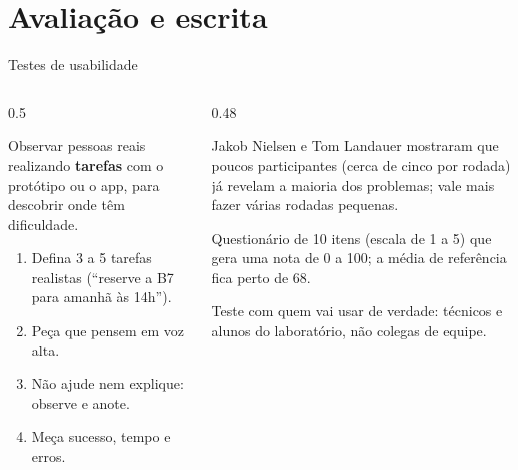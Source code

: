 \documentclass[aspectratio=169,10pt]{beamer}
\begin{document}
\section{Avaliação e escrita}

\begin{frame}{Testes de usabilidade}
  \begin{columns}[T]
    \begin{column}{0.5\textwidth}
      \begin{definicao}
        Observar pessoas reais realizando \textbf{tarefas} com o protótipo ou o app, para descobrir onde têm dificuldade.
      \end{definicao}
      \begin{conceito}
        \begin{enumerate}
          \item Defina 3 a 5 tarefas realistas (``reserve a B7 para amanhã às 14h'').
          \item Peça que pensem em voz alta.
          \item Não ajude nem explique: observe e anote.
          \item Meça sucesso, tempo e erros.
        \end{enumerate}
      \end{conceito}
    \end{column}
    \begin{column}{0.48\textwidth}
      \begin{historia}
        Jakob Nielsen e Tom Landauer mostraram que poucos participantes (cerca de cinco por rodada) já revelam a maioria dos problemas; vale mais fazer várias rodadas pequenas.
      \end{historia}
      \begin{definicao}
        Questionário de 10 itens (escala de 1 a 5) que gera uma nota de 0 a 100; a média de referência fica perto de 68.
      \end{definicao}
      \begin{dica}
        Teste com quem vai usar de verdade: técnicos e alunos do laboratório, não colegas de equipe.
      \end{dica}
    \end{column}
  \end{columns}
\end{frame}
\end{document}
